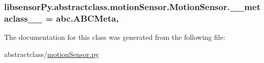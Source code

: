 \subsubsection[{\+\_\+\+\_\+metaclass\+\_\+\+\_\+}]{\setlength{\rightskip}{0pt plus 5cm}libsensor\+Py.\+abstractclass.\+motion\+Sensor.\+Motion\+Sensor.\+\_\+\+\_\+metaclass\+\_\+\+\_\+ = abc.\+A\+B\+C\+Meta\hspace{0.3cm}{\ttfamily [static]}, {\ttfamily [private]}}\label{classlibsensorPy_1_1abstractclass_1_1motionSensor_1_1MotionSensor_a0ace63dc4bf71a4fb56a83fd72a01449}


The documentation for this class was generated from the following file\+:\begin{DoxyCompactItemize}
\item 
abstractclass/\hyperlink{abstractclass_2motionSensor_8py}{motion\+Sensor.\+py}\end{DoxyCompactItemize}
